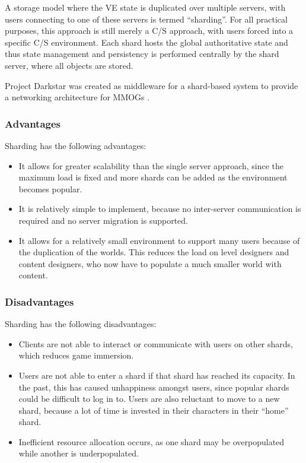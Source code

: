 A storage model where the VE state is duplicated over multiple servers, with users connecting to one of these servers is termed ``sharding''. For all practical purposes, this approach is still merely a C/S approach, with users forced into a specific C/S environment. Each shard hosts the global authoritative state and thus state management and persistency is performed centrally by the shard server, where all objects are stored.

Project Darkstar was created as middleware for a shard-based system to provide a networking architecture for MMOGs \cite{Blackman_darkstar_storage}.

\subsubsection{Advantages}

Sharding has the following advantages:
\begin{itemize}

\item It allows for greater scalability than the single server approach, since the maximum load is fixed and more shards can be added as the environment becomes popular.

\item It is relatively simple to implement, because no inter-server communication is required and no server migration is supported.

\item It allows for a relatively small environment to support many users because of the duplication of the worlds. This reduces the load on level designers and content designers, who now have to populate a much smaller world with content.
\end{itemize}

\subsubsection{Disadvantages}

Sharding has the following disadvantages:
\begin{itemize}
\item Clients are not able to interact or communicate with users on other shards, which reduces game immersion.

\item Users are not able to enter a shard if that shard has reached its capacity. In the past, this has caused unhappiness amongst users, since popular shards could be difficult to log in to. Users are also reluctant to move to a new shard, because a lot of time is invested in their characters in their ``home'' shard.

\item Inefficient resource allocation occurs, as one shard may be overpopulated while another is underpopulated.
\end{itemize}

